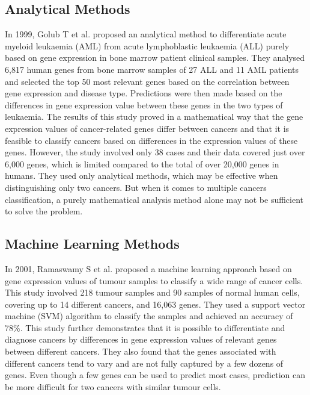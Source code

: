 \documentclass[12pt,a4paper]{report}
\begin{document}
\subsection{Analytical Methods }
In 1999, Golub T et al. \cite{Gol99} proposed an analytical method to differentiate acute myeloid leukaemia (AML) from acute lymphoblastic leukaemia (ALL) purely based on gene expression in bone marrow patient clinical samples. They analysed 6,817 human genes from bone marrow samples of 27 ALL and 11 AML patients and selected the top 50 most relevant genes based on the correlation between gene expression and disease type. Predictions were then made based on the differences in gene expression value between these genes in the two types of leukaemia. The results of this study proved in a mathematical way that the gene expression values of cancer-related genes differ between cancers and that it is feasible to classify cancers based on differences in the expression values of these genes. However, the study involved only 38 cases and their data covered just over 6,000 genes, which is limited compared to the total of over 20,000 genes in humans. They used only analytical methods, which may be effective when distinguishing only two cancers. But when it comes to multiple cancers classification, a purely mathematical analysis method alone may not be sufficient to solve the problem.\\

\subsection{Machine Learning Methods}
In 2001, Ramaswamy S et al. \cite{Ram01} proposed a machine learning approach based on gene expression values of tumour samples to classify a wide range of cancer cells. This study involved 218 tumour samples and 90 samples of normal human cells, covering up to 14 different cancers, and 16,063 genes. They used a support vector machine (SVM) algorithm to classify the samples and achieved an accuracy of 78\%. This study further demonstrates that it is possible to differentiate and diagnose cancers by differences in gene expression values of relevant genes between different cancers. They also found that the genes associated with different cancers tend to vary and are not fully captured by a few dozens of genes. Even though a few genes can be used to predict most cases, prediction can be more difficult for two cancers with similar tumour cells.\\
\end{document}
